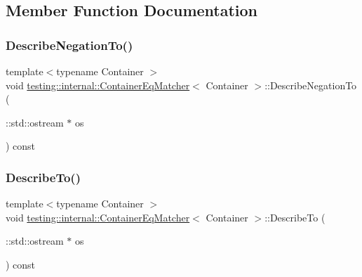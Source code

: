 \subsection{Member Function Documentation}
\mbox{\label{classtesting_1_1internal_1_1_container_eq_matcher_a3dc9e61b6aff65039325138dccccb8ec}} 
\subsubsection{\texorpdfstring{Describe\+Negation\+To()}{DescribeNegationTo()}}
{\footnotesize\ttfamily template$<$typename Container $>$ \\
void \hyperlink{classtesting_1_1internal_1_1_container_eq_matcher}{testing\+::internal\+::\+Container\+Eq\+Matcher}$<$ Container $>$\+::Describe\+Negation\+To (\begin{DoxyParamCaption}\item[{\+::std\+::ostream $\ast$}]{os }\end{DoxyParamCaption}) const\hspace{0.3cm}{\ttfamily [inline]}}

\mbox{\label{classtesting_1_1internal_1_1_container_eq_matcher_a28ace6da475d05134916eb50e54baf1e}} 
\subsubsection{\texorpdfstring{Describe\+To()}{DescribeTo()}}
{\footnotesize\ttfamily template$<$typename Container $>$ \\
void \hyperlink{classtesting_1_1internal_1_1_container_eq_matcher}{testing\+::internal\+::\+Container\+Eq\+Matcher}$<$ Container $>$\+::Describe\+To (\begin{DoxyParamCaption}\item[{\+::std\+::ostream $\ast$}]{os }\end{DoxyParamCaption}) const\hspace{0.3cm}{\ttfamily [inline]}}

